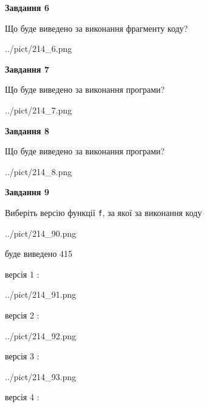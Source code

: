 \documentclass[12pt, ukrainian]{article}
\def\code#1{\Verb!#1!}
\begin{document}
{\begin {large}
{\begin {center}\textbf{Завдання 6}\end {center}}

Що буде виведено за виконання фрагменту коду?\par
\begin{center}
	{../pict/214_6.png}
\end{center}
\newpage

{\begin {center}\textbf{Завдання 7}\end {center}}

Що буде виведено за виконання програми?\par
\begin{center}
	{../pict/214_7.png}
\end{center}
\newpage

{\begin {center}\textbf{Завдання 8}\end {center}}

Що буде виведено за виконання програми?\par
\begin{center}
	{../pict/214_8.png}
\end{center}
\newpage

{\begin {center}\textbf{Завдання 9}\end {center}}

Виберіть версію функції \code{f}, за якої за виконання коду
\begin{center}
	{../pict/214_90.png}
\end{center}
буде виведено 415

\vspace{5mm}
версія 1 :

\begin{center}
	{../pict/214_91.png}
\end{center}
версія 2 :

\begin{center}
	{../pict/214_92.png}
\end{center}
версія 3 :

\begin{center}
	{../pict/214_93.png}
\end{center}
версія 4 :


\end{large}}
\end{document}
